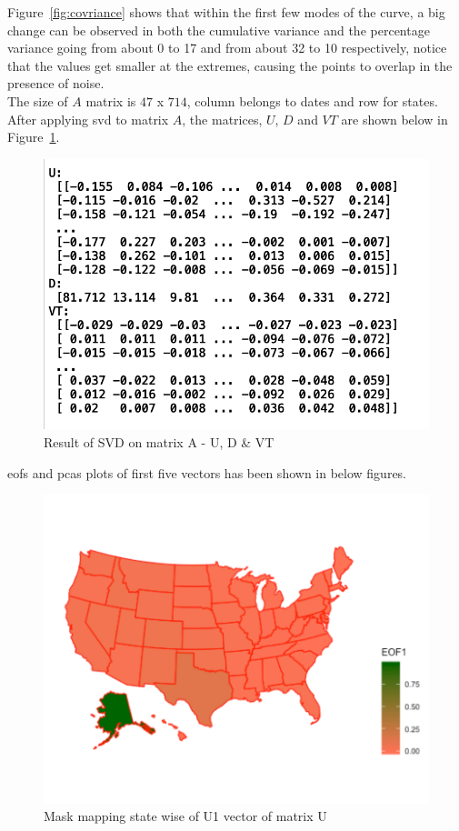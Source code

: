 Figure~\ref{fig:covriance} shows that within the first few modes of the curve, a big change can be observed in both the cumulative variance and the percentage variance going from about 0 to 17 and from about 32 to 10 respectively, notice that the values get smaller at the extremes, causing the points to overlap in the presence of noise.  \\
The size of $A$ matrix is $47$ x $714$, column belongs to dates and row for states. After applying \gls{svd} to matrix $A$, the matrices, $U$, $D$ and $VT$ are shown below in Figure~\ref{fig:svd_result_matrices}.

    \begin{figure}[H]
            \centering
            \includegraphics[width=0.70\linewidth]{figures/ch5/svd_result_matrix.png}
            \caption{\label{fig:svd_result_matrices} Result of SVD on matrix A - U, D \& VT}
    \end{figure}
    
    \gls{eof}s and \gls{pca}s plots of first five vectors has been shown in below figures.
    
     \begin{figure}[H]
            \centering
            \includegraphics[width=0.70\linewidth]{figures/ch5/SVD/eof1.png}
            \caption{\label{fig:EOF_1} Mask mapping state wise of U1 vector of matrix U}
    \end{figure}
    
